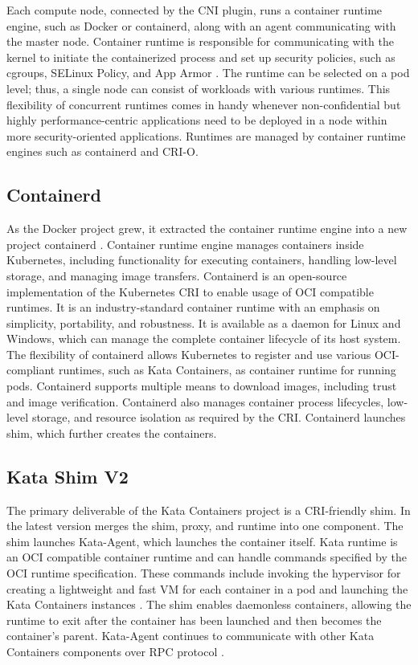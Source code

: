 Each compute node, connected by the CNI plugin, runs a container runtime engine, such as Docker or containerd, along with an agent communicating with the master node. Container runtime is responsible for communicating with the kernel to initiate the containerized process and set up security policies, such as cgroups, SELinux Policy, and App Armor \cite{RedHatCR}. The runtime can be selected on a pod level; thus, a single node can consist of workloads with various runtimes. This flexibility of concurrent runtimes comes in handy whenever non-confidential but highly performance-centric applications need to be deployed in a node within more security-oriented applications. Runtimes are managed by container runtime engines such as containerd and CRI-O.

\subsection{Containerd}

As the Docker project grew, it extracted the container runtime engine into a new project containerd \cite{containerd}. Container runtime engine manages containers inside Kubernetes, including functionality for executing containers, handling low-level storage, and managing image transfers. Containerd is an open-source implementation of the Kubernetes CRI to enable usage of OCI compatible runtimes. It is an industry-standard container runtime with an emphasis on simplicity, portability, and robustness. It is available as a daemon for Linux and Windows, which can manage the complete container lifecycle of its host system. The flexibility of containerd allows Kubernetes to register and use various OCI-compliant runtimes, such as Kata Containers, as container runtime for running pods. Containerd supports multiple means to download images, including trust and image verification. Containerd also manages container process lifecycles, low-level storage, and resource isolation as required by the CRI. Containerd launches shim, which further creates the containers. \cite{containerdGithub}

\subsection{Kata Shim V2}

The primary deliverable of the Kata Containers project is a CRI-friendly shim. In the latest version merges the shim, proxy, and runtime into one component. The shim launches Kata-Agent, which launches the container itself. Kata runtime is an OCI compatible container runtime and can handle commands specified by the OCI runtime specification. These commands include invoking the hypervisor for creating a lightweight and fast VM for each container in a pod and launching the Kata Containers instances \cite{Randazzo2019}. The shim enables daemonless containers, allowing the runtime to exit after the container has been launched and then becomes the container's parent. Kata-Agent continues to communicate with other Kata Containers components over RPC protocol \cite{KataContainersArchitecture}. \cite{Crosby}


